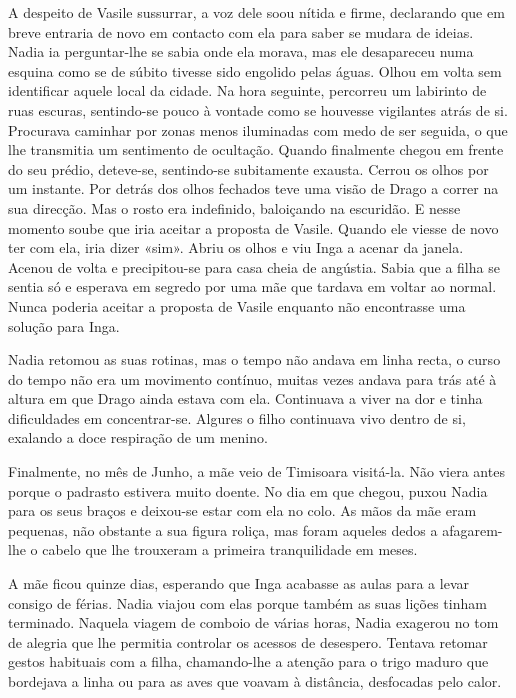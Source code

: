 A despeito de Vasile sussurrar, a voz dele soou nítida e
firme, declarando que em breve entraria de novo em contacto com ela
para saber se mudara de ideias. Nadia ia perguntar-lhe se sabia onde ela
morava, mas ele desapareceu numa esquina como se de súbito tivesse
sido engolido pelas águas. Olhou em volta sem identificar aquele local
da cidade. Na hora seguinte, percorreu um labirinto de ruas escuras,
sentindo-se pouco à vontade como se houvesse vigilantes atrás de si.
Procurava caminhar por zonas menos iluminadas com medo de ser seguida, o
que lhe transmitia um sentimento de ocultação. Quando finalmente
chegou em frente do seu prédio, deteve-se, sentindo-se subitamente exausta. Cerrou os olhos por um instante. Por detrás dos
olhos fechados teve uma visão de Drago a
correr na sua direcção. Mas o rosto era indefinido, baloiçando na
escuridão. E nesse momento soube que iria aceitar a proposta de Vasile.
Quando ele viesse de novo ter com ela, iria dizer «sim». Abriu os olhos
e viu Inga a acenar da janela. Acenou de volta e precipitou-se para
casa cheia de angústia. Sabia que a filha se sentia só e esperava em
segredo por uma mãe que tardava em voltar ao normal. Nunca poderia
aceitar a proposta de Vasile enquanto não encontrasse uma solução para
Inga.

Nadia retomou as suas rotinas, mas o tempo não andava em linha recta, o
curso do tempo não era um movimento contínuo, muitas vezes andava para
trás até à altura em que Drago ainda estava com ela. Continuava a viver
na dor e tinha dificuldades em concentrar-se. Algures o filho continuava
vivo dentro de si, exalando a doce respiração de um menino.

Finalmente, no mês de Junho, a mãe veio de Timisoara visitá-la. Não
viera antes porque o padrasto estivera muito doente. No dia em que
chegou, puxou Nadia para os seus braços e deixou-se estar com ela no
colo. As mãos da mãe eram pequenas, não obstante a sua figura roliça,
mas foram aqueles dedos a afagarem-lhe o cabelo que lhe trouxeram a
primeira tranquilidade em meses.

A mãe ficou quinze dias, esperando que Inga acabasse as aulas para a
levar consigo de férias. Nadia viajou com elas porque também as suas
lições tinham terminado. Naquela viagem de comboio de várias horas,
Nadia exagerou no tom de alegria que lhe permitia controlar os acessos
de desespero. Tentava retomar gestos habituais
com a filha, chamando-lhe a atenção para o trigo maduro que bordejava a
linha ou para as aves que voavam à distância, desfocadas pelo calor.

